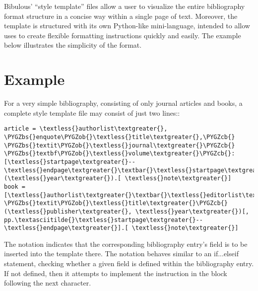 \documentclass[letterpaper,10pt,english]{sphinxmanual}
\def\PYGZbs{\char`\\}
\def\PYGZob{\char`\{}
\def\PYGZcb{\char`\}}
\begin{document}
Bibulous' “style template” files allow a user to visualize the entire bibliography format structure in a concise way within a single page of text. Moreover, the template is structured with its own Python-like mini-language, intended to allow uses to create flexible formatting instructions quickly and easily. The example below illustrates the simplicity of the format.


\section{Example}
\label{index:example}
For a very simple bibliography, consisting of only journal articles and books, a complete style template file may consist of just two lines::

\begin{Verbatim}[commandchars=\\\{\}]
article = \textless{}authorlist\textgreater{}, \PYGZbs{}enquote\PYGZob{}\textless{}title\textgreater{},\PYGZcb{} \PYGZbs{}textit\PYGZob{}\textless{}journal\textgreater{}\PYGZcb{} \PYGZbs{}textbf\PYGZob{}\textless{}volume\textgreater{}\PYGZcb{}: [\textless{}startpage\textgreater{}--\textless{}endpage\textgreater{}\textbar{}\textless{}startpage\textgreater{}\textbar{}\textless{}eid\textgreater{}\textbar{}] (\textless{}year\textgreater{}).[ \textless{}note\textgreater{}]
book = [\textless{}authorlist\textgreater{}\textbar{}\textless{}editorlist\textgreater{}\textbar{}], \PYGZbs{}textit\PYGZob{}\textless{}title\textgreater{}\PYGZcb{} (\textless{}publisher\textgreater{}, \textless{}year\textgreater{})[, pp.\textasciitilde{}\textless{}startpage\textgreater{}--\textless{}endpage\textgreater{}].[ \textless{}note\textgreater{}]
\end{Verbatim}

The  notation indicates that the corresponding bibliography entry's field is to be inserted into the template there. The \code{{[}...\textbar{}...{]}} notation behaves similar to an if...elseif statement, checking whether a given field is defined within the bibliography entry. If not defined, then it attempts to implement the instruction in the block following the next \textbar{} character.
\end{document}
